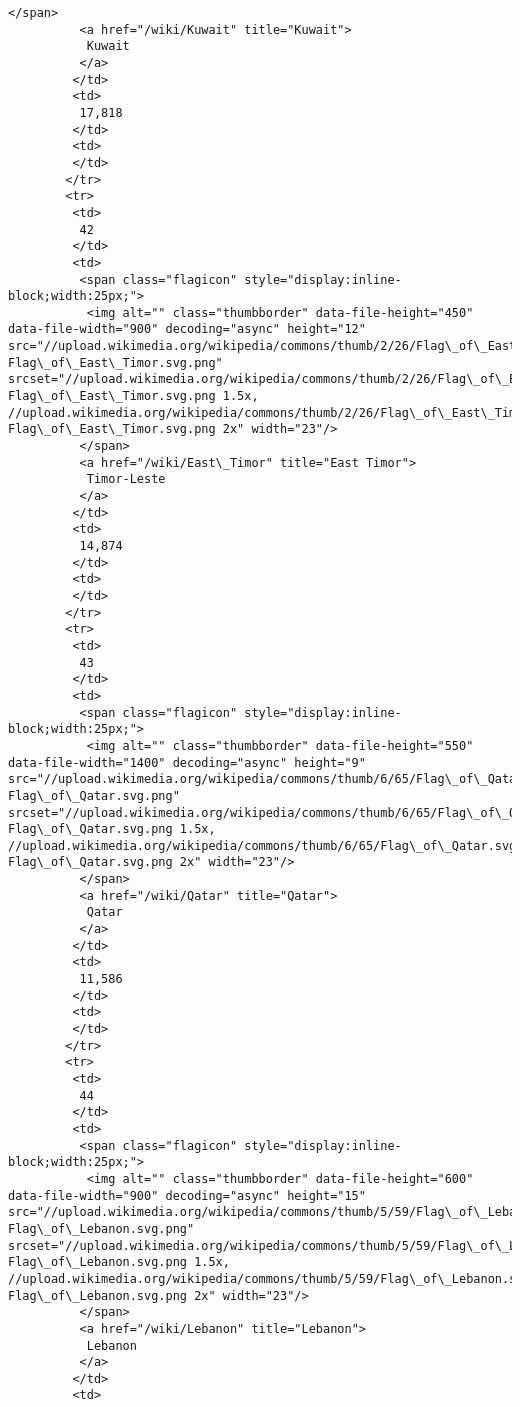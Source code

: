 \documentclass[11pt]{article}
\begin{document}
\begin{Verbatim}[commandchars=\\\{\}]
          </span>
          <a href="/wiki/Kuwait" title="Kuwait">
           Kuwait
          </a>
         </td>
         <td>
          17,818
         </td>
         <td>
         </td>
        </tr>
        <tr>
         <td>
          42
         </td>
         <td>
          <span class="flagicon" style="display:inline-block;width:25px;">
           <img alt="" class="thumbborder" data-file-height="450" data-file-width="900" decoding="async" height="12" src="//upload.wikimedia.org/wikipedia/commons/thumb/2/26/Flag\_of\_East\_Timor.svg/23px-Flag\_of\_East\_Timor.svg.png" srcset="//upload.wikimedia.org/wikipedia/commons/thumb/2/26/Flag\_of\_East\_Timor.svg/35px-Flag\_of\_East\_Timor.svg.png 1.5x, //upload.wikimedia.org/wikipedia/commons/thumb/2/26/Flag\_of\_East\_Timor.svg/46px-Flag\_of\_East\_Timor.svg.png 2x" width="23"/>
          </span>
          <a href="/wiki/East\_Timor" title="East Timor">
           Timor-Leste
          </a>
         </td>
         <td>
          14,874
         </td>
         <td>
         </td>
        </tr>
        <tr>
         <td>
          43
         </td>
         <td>
          <span class="flagicon" style="display:inline-block;width:25px;">
           <img alt="" class="thumbborder" data-file-height="550" data-file-width="1400" decoding="async" height="9" src="//upload.wikimedia.org/wikipedia/commons/thumb/6/65/Flag\_of\_Qatar.svg/23px-Flag\_of\_Qatar.svg.png" srcset="//upload.wikimedia.org/wikipedia/commons/thumb/6/65/Flag\_of\_Qatar.svg/35px-Flag\_of\_Qatar.svg.png 1.5x, //upload.wikimedia.org/wikipedia/commons/thumb/6/65/Flag\_of\_Qatar.svg/46px-Flag\_of\_Qatar.svg.png 2x" width="23"/>
          </span>
          <a href="/wiki/Qatar" title="Qatar">
           Qatar
          </a>
         </td>
         <td>
          11,586
         </td>
         <td>
         </td>
        </tr>
        <tr>
         <td>
          44
         </td>
         <td>
          <span class="flagicon" style="display:inline-block;width:25px;">
           <img alt="" class="thumbborder" data-file-height="600" data-file-width="900" decoding="async" height="15" src="//upload.wikimedia.org/wikipedia/commons/thumb/5/59/Flag\_of\_Lebanon.svg/23px-Flag\_of\_Lebanon.svg.png" srcset="//upload.wikimedia.org/wikipedia/commons/thumb/5/59/Flag\_of\_Lebanon.svg/35px-Flag\_of\_Lebanon.svg.png 1.5x, //upload.wikimedia.org/wikipedia/commons/thumb/5/59/Flag\_of\_Lebanon.svg/45px-Flag\_of\_Lebanon.svg.png 2x" width="23"/>
          </span>
          <a href="/wiki/Lebanon" title="Lebanon">
           Lebanon
          </a>
         </td>
         <td>

\end{Verbatim}
\end{document}
